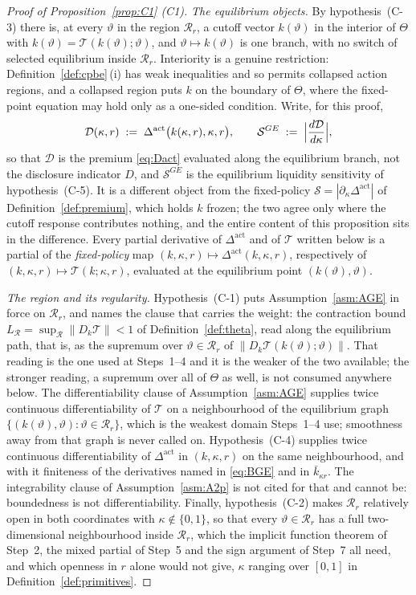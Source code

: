 \documentclass[11pt]{article}
\newcommand{\Dact}{\Delta^{\mathrm{act}}}
\newcommand{\Tmap}{\mathcal{T}}
\begin{document}
\begin{proof}[Proof of Proposition~\ref{prop:C1} (C1)]
\emph{The equilibrium objects.} By hypothesis~(C-3) there is, at every $\vartheta$ in the region
$\mathcal R_r$, a cutoff vector $k(\vartheta)$ in the interior of $\Theta$ with
$k(\vartheta) = \Tmap(k(\vartheta);\vartheta)$, and $\vartheta\mapsto k(\vartheta)$ is one branch,
with no switch of selected equilibrium inside $\mathcal R_r$. Interiority is a genuine restriction:
Definition~\ref{def:cpbe}\,(i) has weak inequalities and so permits collapsed action regions, and a
collapsed region puts $k$ on the boundary of $\Theta$, where the fixed-point equation may hold only
as a one-sided condition. Write, for this proof,
\[
\mathcal D(\kappa,r) \;:=\; \Dact\bigl(k(\kappa,r),\kappa,r\bigr),
\qquad
\mathcal S^{GE} \;:=\; \Bigl\lvert \frac{d\mathcal D}{d\kappa} \Bigr\rvert ,
\]
so that $\mathcal D$ is the premium \eqref{eq:Dact} evaluated along the equilibrium branch, not
the disclosure indicator $D$, and $\mathcal S^{GE}$ is the equilibrium liquidity sensitivity of
hypothesis~(C-5). It is a different object from the fixed-policy $\mathcal S = |\partial_\kappa\Dact|$
of Definition~\ref{def:premium}, which holds $k$ frozen; the two agree only where the cutoff
response contributes nothing, and the entire content of this proposition sits in the difference.
Every partial derivative of $\Dact$ and of $\Tmap$ written below is a partial of the
\emph{fixed-policy} map $(k,\kappa,r)\mapsto\Dact(k,\kappa,r)$, respectively of
$(k,\kappa,r)\mapsto\Tmap(k;\kappa,r)$, evaluated at the equilibrium point
$(k(\vartheta),\vartheta)$.

\emph{The region and its regularity.} Hypothesis~(C-1) puts Assumption~\ref{asm:AGE} in force on
$\mathcal R_r$, and names the clause that carries the weight: the contraction bound
$L_{\mathcal R} = \sup_{\mathcal R}\lVert D_k\Tmap\rVert < 1$ of Definition~\ref{def:theta}, read
along the equilibrium path, that is, as the supremum over $\vartheta \in \mathcal R_r$ of
$\lVert D_k\Tmap(k(\vartheta);\vartheta)\rVert$. That reading is the one used at Steps~1--4 and it
is the weaker of the two available; the stronger reading, a supremum over all of $\Theta$ as well,
is not consumed anywhere below. The differentiability clause of Assumption~\ref{asm:AGE} supplies
twice continuous differentiability of $\Tmap$ on a neighbourhood of the equilibrium graph
$\{(k(\vartheta),\vartheta) : \vartheta\in\mathcal R_r\}$, which is the weakest domain Steps~1--4
use; smoothness away from that graph is never called on. Hypothesis~(C-4) supplies twice continuous
differentiability of $\Dact$ in $(k,\kappa,r)$ on the same neighbourhood, and with it finiteness of
the derivatives named in \eqref{eq:BGE} and in $\bar k_{\kappa r}$. The integrability clause of
Assumption~\ref{asm:A2p} is not cited for that and cannot be: boundedness is not differentiability.
Finally, hypothesis~(C-2) makes $\mathcal R_r$ relatively open in both coordinates with
$\kappa\notin\{0,1\}$, so that every $\vartheta\in\mathcal R_r$ has a full two-dimensional
neighbourhood inside $\mathcal R_r$, which the implicit function theorem of Step~2, the mixed
partial of Step~5 and the sign argument of Step~7 all need, and which openness in $r$ alone would
not give, $\kappa$ ranging over $[0,1]$ in Definition~\ref{def:primitives}.


\end{proof}
\end{document}
